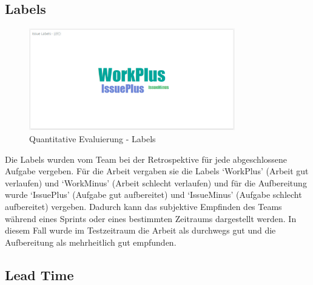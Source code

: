 \clearpage
\subsection*{Labels}

\begin{savenotes}
    \begin{figure}[H]
      \centering
      \includegraphics[width=0.8\textwidth]{img/eval-labels.png}
      \caption{Quantitative Evaluierung {-} Labels}\label{fig:eval_labels}
    \end{figure}
\end{savenotes}

Die Labels wurden vom Team bei der Retrospektive für jede abgeschlossene Aufgabe vergeben.
Für die Arbeit vergaben sie die Labels `WorkPlus' (Arbeit gut verlaufen) und `WorkMinus' (Arbeit schlecht verlaufen) und für die Aufbereitung wurde `IssuePlus' (Aufgabe gut aufbereitet) und `IssueMinus' (Aufgabe schlecht aufbereitet) vergeben.
Dadurch kann das subjektive Empfinden des Teams während eines Sprints oder eines bestimmten Zeitraums dargestellt werden.
In diesem Fall wurde im Testzeitraum die Arbeit als durchwegs gut und die Aufbereitung als mehrheitlich gut empfunden.

\clearpage
\subsection*{Lead Time}

